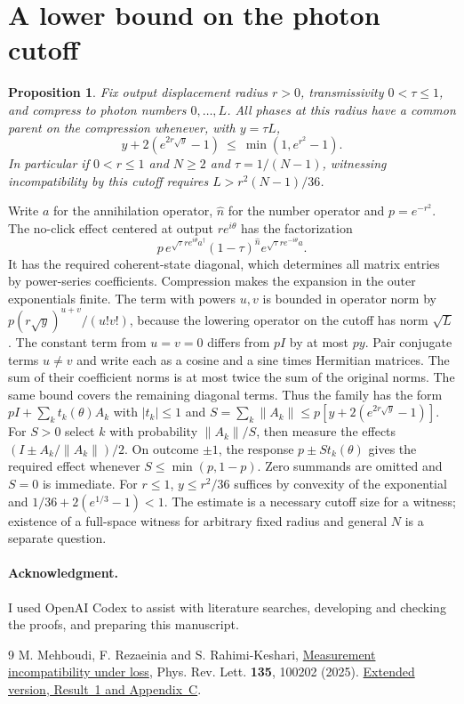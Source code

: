 \documentclass[10pt,a4paper]{article}
\newtheorem{proposition}[theorem]{Proposition}
\newcommand{\norm}[1]{\lVert #1\rVert}
\begin{document}
\section{A lower bound on the photon cutoff}
\begin{proposition}
Fix output displacement radius \(r>0\), transmissivity \(0<\tau\le1\), and
compress to photon numbers \(0,\ldots,L\). All phases at this radius have
a common parent on the compression whenever, with \(y=\tau L\),
\[
 y+2(e^{2r\sqrt y}-1)\ \le\ \min(1,e^{r^2}-1).
\]
In particular if \(0<r\le1\) and \(N\ge2\) and \(\tau=1/(N-1)\), witnessing
incompatibility by this cutoff requires \(L>r^2(N-1)/36\).
\end{proposition}
Write \(a\) for the annihilation operator, \(\hat n\) for the number operator
and \(p=e^{-r^2}\). The no-click effect centered at output \(re^{i\theta}\)
has the factorization
\[
 p\,e^{\sqrt{\tau}r e^{i\theta}a^\dagger}
       (1-\tau)^{\hat n}e^{\sqrt{\tau}r e^{-i\theta}a}.
\]
It has the required coherent-state diagonal, which determines all matrix
entries by power-series coefficients. Compression makes the expansion in
the outer exponentials finite. The term with powers \(u,v\) is bounded in
operator norm by \(p(r\sqrt y)^{u+v}/(u!v!)\), because the lowering
operator on the cutoff has norm \(\sqrt L\). The constant term from \(u=v=0\)
differs from \(pI\) by at most \(py\). Pair conjugate terms
\(u\ne v\) and write each as a cosine and a sine times Hermitian matrices.
The sum of their coefficient norms is at most twice the sum of the
original norms. The same bound covers the remaining diagonal terms. Thus
the family has the form \(pI+\sum_k t_k(\theta)A_k\) with \(|t_k|\le1\)
and \(S=\sum_k\norm{A_k}\le p[y+2(e^{2r\sqrt y}-1)]\).
For \(S>0\) select \(k\) with probability \(\norm{A_k}/S\), then measure
the effects \((I\pm A_k/\norm{A_k})/2\). On outcome \(\pm1\), the response
\(p\pm S t_k(\theta)\) gives the required effect whenever \(S\le\min(p,1-p)\).
Zero summands are omitted and \(S=0\) is immediate. For \(r\le1\),
\(y\le r^2/36\) suffices by convexity of the exponential and
\(1/36+2(e^{1/3}-1)<1\). The estimate is a necessary cutoff size for a witness; existence of a full-space witness for arbitrary fixed radius and general \(N\) is a separate question.

\paragraph{Acknowledgment.} I used OpenAI Codex to assist with literature searches, developing and checking the proofs, and preparing this manuscript.
\begin{thebibliography}{9}
 M. Mehboudi, F. Rezaeinia and S. Rahimi-Keshari, \href{https://doi.org/10.1103/s9sp-2fd7}{Measurement incompatibility under loss}, Phys. Rev. Lett. \textbf{135}, 100202 (2025). \href{https://arxiv.org/html/2411.05920v3}{Extended version, Result~1 and Appendix~C}.
\end{thebibliography}
\end{document}
